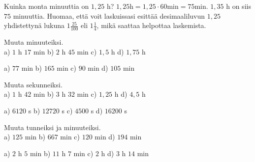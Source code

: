 
\begin{esimerkki}
Kuinka monta minuuttia on $1,25$ h? $1,25 \text{h} = 1,25 \cdot 60 \text{min} = 75 \text{min}$. $1,35$ h on siis $75$ minuuttia. Huomaa, että voit laskuissasi esittää desimaaliluvun $1,25$ yhdistettynä lukuna $1 \frac{25}{100}$ eli $1 \frac{1}{4}$, mikä saattaa helpottaa laskemista.
\end{esimerkki}

\begin{esimerkki}
\end{esimerkki}

\begin{esimerkki}
\end{esimerkki}

\begin{tehtava}
Muuta minuuteiksi. \\
a) $1$ h $17$ min \qquad
b) $2$ h $45$ min \qquad
c) $1,5$ h \qquad
d) $1,75$ h
\begin{vastaus}
a) $77$ min \qquad
b) $165$ min \qquad
c) $90$ min \qquad
d) $105$ min
\end{vastaus}
\end{tehtava}

\begin{tehtava}
Muuta sekunneiksi. \\
a) $1$ h $42$ min \qquad
b) $3$ h $32$ min \qquad
c) $1,25$ h \qquad
d) $4,5$ h
\begin{vastaus}
a) $6120$ s \qquad
b) $12720$ s \qquad
c) $4500$ s \qquad
d) $16200$ s
\end{vastaus}
\end{tehtava}

\begin{tehtava}
Muuta tunneiksi ja minuuteiksi. \\
a) $125$ min \qquad
b) $667$ min \qquad
c) $120$ min \qquad
d) $194$ min
\begin{vastaus}
a) $2$ h $5$ min \qquad
b) $11$ h $7$ min \qquad
c) $2$ h \qquad
d) $3$ h $14$ min
\end{vastaus}
\end{tehtava}



